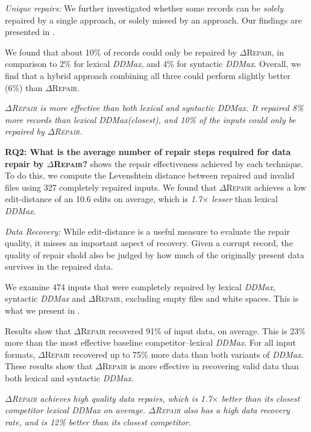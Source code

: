 \documentclass[acmsmall,screen,review,anonymous]{acmart}
\newenvironment{result}{\begin{framed}\centering\it}{\end{framed}}
\newcommand{\dtask}{data repair\xspace}
\newcommand{\approach}{\textsc{$\Delta$Repair}\xspace}
\newcommand{\ddmax}{\textit{DDMax}\xspace}
\newcommand{\drepair}{\approach}
\begin{document}
\noindent\emph{Unique repairs:} We further investigated whether some records can
be \emph{solely} repaired by a single approach, or solely missed by an approach.
Our findings are presented in .

We found that about 10\% of records could only be repaired by \drepair,
in comparison to 2\% for lexical \ddmax, and 4\% for syntactic \ddmax.
Overall, we find that a hybrid approach combining all three could perform
slightly better (6\%) than \drepair.


\begin{result}
\drepair is more effective than both lexical and syntactic \ddmax.
It repaired 8\% more records than lexical \ddmax (closest),
and 10\% of the inputs could only be repaired by \drepair.
\end{result}

\noindent\textbf{RQ2: What is the average number of repair steps required for \dtask by \drepair?}
 shows the repair effectiveness achieved by each technique.
To do this, we compute the Levenshtein distance between repaired and invalid files using
327 completely repaired inputs.
We found that \drepair achieves a low edit-distance of an 10.6 edits on average,
which is \emph{1.7$\times$ lesser} than lexical \ddmax.


\noindent\emph{Data Recovery:}
While edit-distance is a useful measure to evaluate the repair quality, it
misses an important aspect of recovery. Given a corrupt record, the quality of
repair shold also be judged by how much of the originally present data survives
in the repaired data. 

We examine 474 inputs that were completely repaired by lexical \ddmax,
syntactic \ddmax and \drepair,
excluding empty files and white spaces. This is what we present in .

Results show that \drepair recovered 91\% of input data, on average.
This is 23\% more than the most effective baseline competitor--lexical \ddmax.
For all input formats, \drepair recovered up to 75\% more data than both
variants of \ddmax.
These results show that \approach is more effective in recovering valid data
than both lexical and syntactic \ddmax.

\begin{result}
\drepair achieves high quality data repairs, which is 1.7$\times$ better than its
closest competitor lexical \ddmax on average.
\drepair also has a high data recovery rate, and is 12\% better than its closest
competitor.
\end{result}
\end{document}
